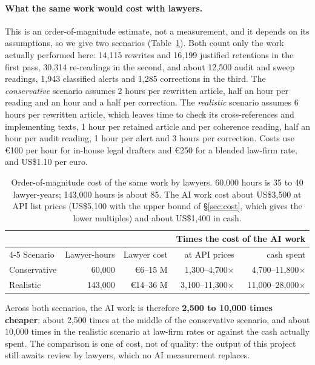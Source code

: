 \documentclass[11pt,a4paper]{article}
\begin{document}
\paragraph{What the same work would cost with lawyers.}
This is an order-of-magnitude estimate, not a measurement, and it depends on its assumptions, so we give two scenarios (Table~\ref{tab:lawyers}). Both count only the work actually performed here: 14{,}115 rewrites and 16{,}199 justified retentions in the first pass, 30{,}314 re-readings in the second, and about 12{,}500 audit and sweep readings, 1{,}943 classified alerts and 1{,}285 corrections in the third. The \emph{conservative} scenario assumes 2 hours per rewritten article, half an hour per reading and an hour and a half per correction. The \emph{realistic} scenario assumes 6 hours per rewritten article, which leaves time to check its cross-references and implementing texts, 1 hour per retained article and per coherence reading, half an hour per audit reading, 1 hour per alert and 3 hours per correction. Costs use \euro{}100 per hour for in-house legal drafters and \euro{}250 for a blended law-firm rate, and US\$1.10 per euro.

\begin{table}[ht]
\centering
\small
\begin{tabular}{lrrrr}
\toprule
& & & \multicolumn{2}{c}{Times the cost of the AI work}\\
\cmidrule(lr){4-5}
Scenario & Lawyer-hours & Lawyer cost & at API prices & cash spent\\
\midrule
Conservative & 60{,}000 & \euro{}6--15 M & 1{,}300--4{,}700$\times$ & 4{,}700--11{,}800$\times$\\
Realistic & 143{,}000 & \euro{}14--36 M & 3{,}100--11{,}300$\times$ & 11{,}000--28{,}000$\times$\\
\bottomrule
\end{tabular}
\caption{Order-of-magnitude cost of the same work by lawyers. 60{,}000 hours is 35 to 40 lawyer-years; 143{,}000 hours is about 85. The AI work cost about US\$3{,}500 at API list prices (US\$5{,}100 with the upper bound of \S\ref{sec:cost}, which gives the lower multiples) and about US\$1{,}400 in cash.}
\label{tab:lawyers}
\end{table}

Across both scenarios, the AI work is therefore \textbf{2{,}500 to 10{,}000 times cheaper}: about 2{,}500 times at the middle of the conservative scenario, and about 10{,}000 times in the realistic scenario at law-firm rates or against the cash actually spent. The comparison is one of cost, not of quality: the output of this project still awaits review by lawyers, which no AI measurement replaces.
\end{document}
